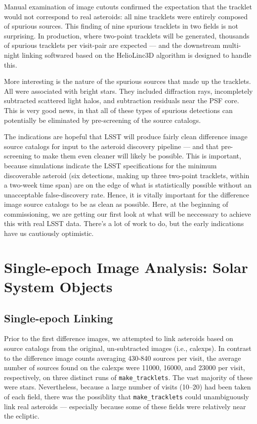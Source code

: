 Manual examination of image cutouts confirmed the expectation that the tracklet would not correspond to real asteroids: all nine tracklets were entirely composed of spurious sources. This finding of nine spurious tracklets in two fields is not surprising. In production, where two-point tracklets will be generated, thousands of spurious tracklets per visit-pair are expected --- and the downstream multi-night linking softwared based on the HelioLinc3D algorithm is designed to handle this.

More interesting is the nature of the spurious sources that made up the tracklets. All were associated with bright stars. They included diffraction rays, incompletely subtracted scattered light halos, and subtraction residuals near the PSF core. This is very good news, in that all of these types of spurious detections can potentially be eliminated by pre-screening of the source catalogs.

The indications are hopeful that LSST will produce fairly clean difference image source catalogs for input to the asteroid discovery pipeline --- and that pre-screening to make them even cleaner will likely be possible. This is important, because simulations indicate the LSST specifications for the minimum discoverable asteroid (six detections, making up three two-point tracklets, within a two-week time span) are on the edge of what is statistically possible without an unacceptable false-discovery rate. Hence, it is vitally important for the difference image source catalogs to be as clean as possible. Here, at the beginning of commissioning, we are getting our first look at what will be neccessary to achieve this with real LSST data. There's a lot of work to do, but the early indications have us cautiously optimistic.

\section{Single-epoch Image Analysis: Solar System Objects}
\label{sec:sia_solar_system}

\subsection{Single-epoch Linking}
\label{sec:linking}

Prior to the first difference images, we attempted to link asteroids based on source catalogs from the original, un-subtracted images (i.e., calexps). In contrast to the difference image counts averaging 430-840 sources per visit, the average number of sources found on the calexps were 11000, 16000, and 23000 per visit, respectively, on three distinct runs of {\tt make\_tracklets}. The vast majority of these were stars. Nevertheless, because a large number of visits (10--20) had been taken of each field, there was the possiblity that {\tt make\_tracklets} could unambiguously link real asteroids --- especially because some of these fields were relatively near the ecliptic.

